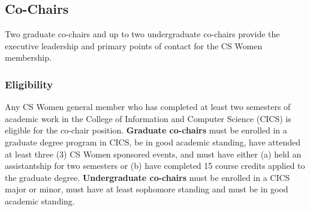 \subsection{Co-Chairs}
\label{sec:cochairs}
Two graduate co-chairs and up to two undergraduate co-chairs provide the executive leadership and primary points of contact for the CS Women membership.

\subsubsection{Eligibility}
\label{sec:cochairs_eligibility}
Any CS Women general member who has completed at least two semesters of academic work in the College of Information and Computer Science (CICS) is eligible for the co-chair position. \textbf{Graduate co-chairs} must be enrolled in a graduate degree program in CICS, be in good academic standing, have attended at least three (3) CS Women sponsored events, and must have either (a) held an assistantship for two semesters or (b) have completed 15 course credits applied to the graduate degree. \textbf{Undergraduate co-chairs} must be enrolled in a CICS major or minor, must have at least sophomore standing and must be in good academic standing.

